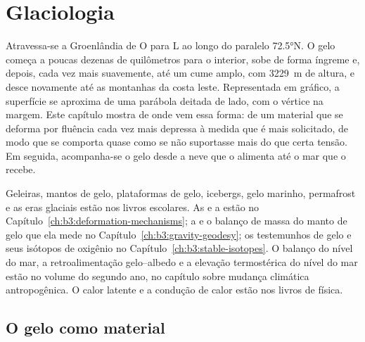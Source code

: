 \chapter{Glaciologia}\label{ch:b3:glaciology}

Atravessa-se a Groenlândia de O para L ao longo do paralelo \ang{72.5}N. O gelo
começa a poucas dezenas de quilômetros para o interior, sobe de forma íngreme e, depois, cada vez mais suavemente,
até um cume amplo, com \qty{3229}{m} de altura, e desce novamente até as montanhas da
costa leste. Representada em gráfico, a superfície se aproxima de uma parábola deitada de lado,
com o vértice na margem. Este capítulo mostra de onde vem essa forma:
de um material que se deforma por fluência cada vez mais depressa à medida que é mais solicitado,
de modo que se comporta quase como se não suportasse mais do que certa tensão.
Em seguida, acompanha-se o gelo desde a neve que o alimenta até o mar que o
recebe.

\begin{recall}
Geleiras, mantos de gelo, plataformas de gelo, icebergs, gelo marinho, permafrost e as
eras glaciais estão nos livros escolares. As  e a 
estão no Capítulo~\ref{ch:b3:deformation-mechanisms}; a  e o
balanço de massa do manto de gelo que ela mede no Capítulo~\ref{ch:b3:gravity-geodesy};
os testemunhos de gelo e seus isótopos de oxigênio no Capítulo~\ref{ch:b3:stable-isotopes}.
O balanço do nível do mar, a retroalimentação gelo--albedo e a elevação termostérica do
nível do mar estão no volume do segundo ano, no capítulo sobre mudança climática
antropogênica. O calor latente e a condução de calor estão nos livros de física.
\end{recall}

\section{O gelo como material}\label{sec:b3:glaciology:material}

